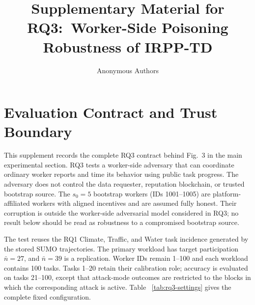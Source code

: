 \documentclass[journal]{IEEEtran}
\begin{document}
\title{Supplementary Material for RQ3:\ Worker-Side Poisoning Robustness of IRPP-TD}
\author{Anonymous Authors}
\maketitle

\section{Evaluation Contract and Trust Boundary}
\label{app:rq3-contract}

This supplement records the complete RQ3 contract behind Fig.~3 in the main
experimental section. RQ3 tests a worker-side adversary that can coordinate
ordinary worker reports and time its behavior using public task progress. The
adversary does not control the data requester, reputation blockchain, or trusted
bootstrap source. The $s_0=5$ bootstrap workers (IDs 1001--1005) are
platform-affiliated workers with aligned incentives and are assumed fully
honest. Their corruption is outside the worker-side adversarial model considered
in RQ3; no result below should be read as robustness to a compromised bootstrap
source.

The test reuses the RQ1 Climate, Traffic, and Water task incidence generated by
the stored SUMO trajectories. The primary workload has target participation
$\bar n=27$, and $\bar n=39$ is a replication. Worker IDs remain 1--100 and
each workload contains 100 tasks. Tasks 1--20 retain their calibration role;
accuracy is evaluated on tasks 21--100, except that attack-mode outcomes are
restricted to the blocks in which the corresponding attack is active. Table~
\ref{tab:rq3-settings} gives the complete fixed configuration.
\end{document}
